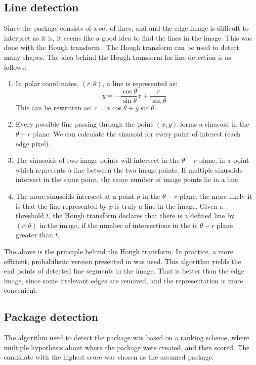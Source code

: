 \subsection{Line detection} \label{method:line_detection}%
Since the package consists of a set of lines, and and the edge image is difficult to interpret as it is, it seems like a good idea to find the lines in the image.
This was done with the Hough transform \cite{illingworth1988survey}.
The Hough transform can be used to detect many shapes.
The idea behind the Hough transform for line detection is as follows:
\begin{enumerate}
	\item In polar coordinates, $(r, \theta)$, a line is represented as: $$y = -\frac{\cos \theta}{\sin \theta} x + \frac{r}{\sin \theta}$$ This can be rewritten as: $r = x \cos \theta + y \sin \theta$. 
	\item Every possible line passing through the point $(x,y)$ forms a sinusoid in the $\theta - r$ plane. We can calculate the sinusoid for every point of interest (each edge pixel).
	\item The sinusoids of two image points will intersect in the $\theta - r$ plane, in a point which represents a line between the two image points. If multiple sinusoids intersect in the same point, the same number of image points lie in a line.
	\item The more sinusoids intersect at a point $p$ in the $\theta - r$ plane, the more likely it is that the line represented by $p$ is truly a line in the image. Given a threshold $t$, the Hough transform declares that there is a defined line by $(r, \theta)$ in the image, if the number of intersections in the is $\theta - r$ plane greater than $t$.
\end{enumerate}
The above is the principle behind the Hough transform.
In practice, a more efficient, probabilistic version presented in \cite{houghp} was used. 
This algorithm yields the end points of detected line segments in the image.
That is better than the edge image, since some irrelevant edges are removed, and the representation is more convenient.

\subsection{Package detection} \label{method:package_detection}
The algorithm used to detect the package was based on a ranking scheme, where multiple hypothesis about where the package were created, and then scored. 
The candidate with the highest score was chosen as the assumed package. 

